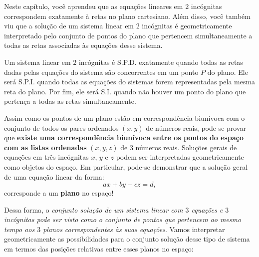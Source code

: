
Neste capítulo, você aprendeu que as equações lineares em $2$ incógnitas correspondem exatamente à retas no plano cartesiano. Além disso, você também viu que a solução de um sistema linear em $2$ incógnitas é geometricamente interpretado pelo conjunto de pontos do plano que pertencem simultaneamente a todas as retas associadas às equações desse sistema. 

Um sistema linear em $2$ incógnitas é S.P.D. exatamente quando todas as retas dadas pelas equações do sistema são concorrentes em um ponto $P$ do plano. Ele será S.P.I. quando todas as equações do sistemas forem representadas pela mesma reta do plano. Por fim, ele será S.I. quando não houver um ponto do plano que pertença a todas as retas simultaneamente.

Assim como os pontos de um plano estão em correspondência biunívoca com o conjunto de todos os pares ordenados $(x,y)$ de números reais, pode-se provar que \textbf{existe uma correspondência biunívoca entre os pontos do espaço com as listas ordenadas} $(x,y,z)$ de $3$ números reais. Soluções gerais de equações em três incógnitas $x$, $y$ e $z$ podem ser interpretadas geometricamente como objetos do espaço. Em particular, pode-se demonstrar que a solução geral de uma equação linear da forma:
$$
ax + by +cz = d,
$$ 
corresponde a um \textbf{plano} no espaço! 

Dessa forma, o \emph{conjunto solução de um sistema linear com $3$ equações e $3$ incógnitas pode ser visto como o conjunto de pontos que pertencem ao mesmo tempo aos $3$ planos correspondentes às suas equações}. Vamos interpretar geometricamente as possibilidades para o conjunto solução desse tipo de sistema em termos das posições relativas entre esses planos no espaço:

